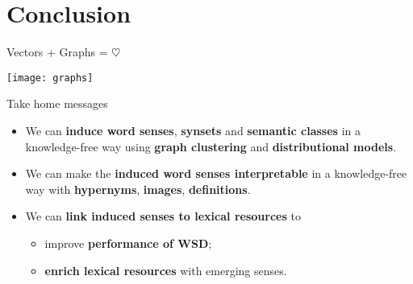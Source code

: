 
\section{Conclusion}


\begin{frame}{Vectors + Graphs = $\heartsuit$ }

\begin{center}
\texttt{[image: graphs]}	
\end{center}

\end{frame}

\begin{frame}{Take home messages}

\begin{itemize}
	\item We can \alert{\textbf{induce word senses}}, \alert{\textbf{synsets}} and \alert{\textbf{semantic classes}} in a knowledge-free way using \textbf{graph clustering} and \textbf{distributional models}.
    \vspace{1em}
    \pause
    
	\item We can make the \alert{\textbf{induced word senses interpretable}} in a knowledge-free way with \textbf{hypernyms}, \textbf{images},  \textbf{definitions}. 
	\vspace{1em}
    \pause
	
	\item We can \alert{\textbf{link induced senses to lexical resources}} to
	\begin{itemize} 
		\item improve \textbf{performance of WSD};
		\item \textbf{enrich lexical resources} with emerging senses.
	\end{itemize}
	
\end{itemize}


\end{frame}


